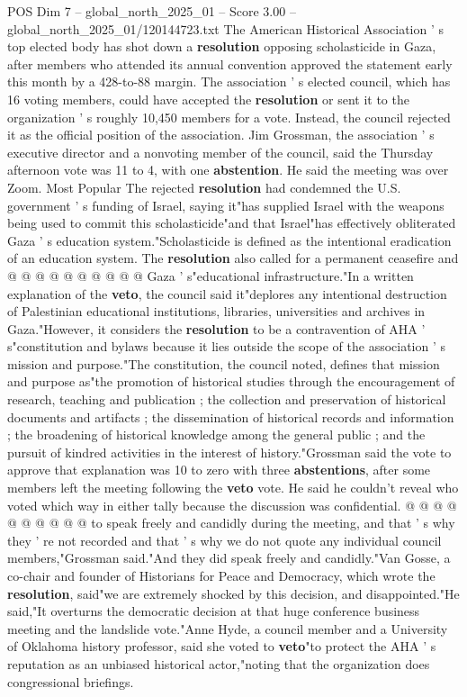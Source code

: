 \begin{textsample}{POS Dim 7 – global\_north\_2025\_01 – Score 3.00 – global\_north\_2025\_01/120144723.txt}  \label{ex:f7_pos_391}
The American Historical Association ' s top elected body has shot down a \textbf{resolution} opposing scholasticide in Gaza, after members who attended its annual convention approved the statement early this month by a 428-to-88 margin.
The association ' s elected council, which has 16 voting members, could have accepted the \textbf{resolution} or sent it to the organization ' s roughly 10,450 members for a vote.
Instead, the council rejected it as the official position of the association.
Jim Grossman, the association ' s executive director and a nonvoting member of the council, said the Thursday afternoon vote was 11 to 4, with one \textbf{abstention}.
He said the meeting was over Zoom.
Most Popular The rejected \textbf{resolution} had condemned the U.S. government ' s funding of Israel, saying it"has supplied Israel with the weapons being used to commit this scholasticide"and that Israel"has effectively obliterated Gaza ' s education system."Scholasticide is defined as the intentional eradication of an education system.
The \textbf{resolution} also called for a permanent ceasefire and @ @ @ @ @ @ @ @ @ @ Gaza ' s"educational infrastructure."In a written explanation of the \textbf{veto}, the council said it"deplores any intentional destruction of Palestinian educational institutions, libraries, universities and archives in Gaza."However, it considers the \textbf{resolution} to be a contravention of AHA ' s"constitution and bylaws because it lies outside the scope of the association ' s mission and purpose."The constitution, the council noted, defines that mission and purpose as"the promotion of historical studies through the encouragement of research, teaching and publication ; the collection and preservation of historical documents and artifacts ; the dissemination of historical records and information ; the broadening of historical knowledge among the general public ; and the pursuit of kindred activities in the interest of history."Grossman said the vote to approve that explanation was 10 to zero with three \textbf{abstentions}, after some members left the meeting following the \textbf{veto} vote.
He said he couldn't reveal who voted which way in either tally because the discussion was confidential. @ @ @ @ @ @ @ @ @ @ to speak freely and candidly during the meeting, and that ' s why they ' re not recorded and that ' s why we do not quote any individual council members,"Grossman said."And they did speak freely and candidly."Van Gosse, a co-chair and founder of Historians for Peace and Democracy, which wrote the \textbf{resolution}, said"we are extremely shocked by this decision, and disappointed."He said,"It overturns the democratic decision at that huge conference business meeting and the landslide vote."Anne Hyde, a council member and a University of Oklahoma history professor, said she voted to \textbf{veto}"to protect the AHA ' s reputation as an unbiased historical actor,"noting that the organization does congressional briefings.

\end{textsample}
